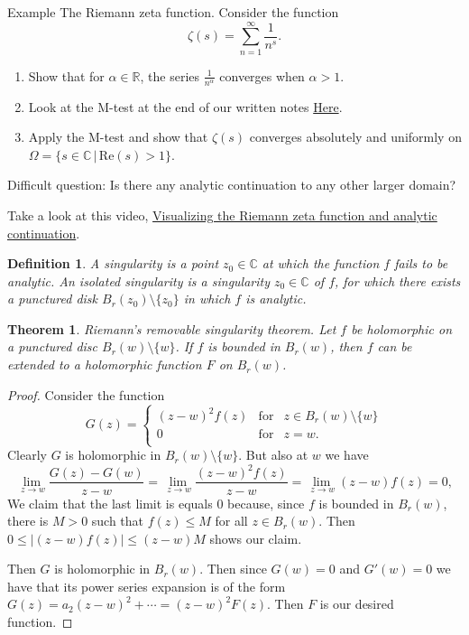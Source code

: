 \documentclass{amsart}
\newtheorem{thm}{Theorem}
\newtheorem{mydef}{Definition}
\begin{document}
\alert{Example} The Riemann zeta function. Consider the function 
\[ \zeta(s) = \sum_{n=1}^{\infty} \frac{1}{n^s} .\]
\begin{enumerate}
\item Show that for \(\alpha \in \mathbb{R}\), the series \(\frac{1}{n^{\alpha}}\) converges when \(\alpha >1\).
\item Look at the M-test at the end of our written notes \alert{\href{https://platforma2.polsl.pl/rms/pluginfile.php/180132/mod\_resource/content/1/Lecture\_power\_series.pdf}{Here}}.
\item Apply the M-test and show that \(\zeta(s)\) converges absolutely and uniformly on \(\Omega = \{ s\in \mathbb{C}\,|\, \mbox{Re}(s) >1 \}\).
\end{enumerate}

Difficult question: Is there any analytic continuation to any other larger domain?

Take a look at this video, \alert{\href{https://youtu.be/sD0NjbwqlYw}{Visualizing the Riemann zeta function and analytic continuation}}.


\begin{mydef}
A \alert{singularity}  is a point \(z_0\in \mathbb{C}\) at which the function \(f\) fails to be analytic.
An \alert{isolated singularity} is a singularity \(z_0\in \mathbb{C}\) of \(f\), for which there exists a punctured disk \(B_r(z_0)\setminus\{z_0\}\) in which \(f\) is analytic.
\end{mydef}


\begin{thm}
\alert{Riemann's removable singularity theorem}. Let \(f\) be holomorphic on a punctured disc \(B_r(w) \setminus \{w\}\). If \(f\) is bounded in \(B_r(w)\), then \(f\) can be extended to a holomorphic function \(F\) on \(B_r(w)\).
\end{thm}
\begin{proof}
Consider the function
\[ G(z) = \left\{ \begin{array}{ccc}
(z-w)^2 f(z) & \mbox{for} & z \in B_r(w)\setminus\{w\} \\
0 & \mbox{for} & z = w. \\
\end{array} \right. \]
Clearly \(G\) is holomorphic in \(B_r(w)\setminus\{w\}\). But also at \(w\) we have
\[ \lim_{\ z \to w} \frac{ G(z) - G(w)}{z-w} = \lim_{\ z \to w} \frac{(z-w)^2 f(z)}{z-w} = \lim_{\ z \to w} (z-w)f(z) = 0, \]
We claim that the last limit is equals \(0\) because, since \(f\) is bounded in \(B_r(w)\), there is \(M>0\) such that \(f(z) \leq M\) for all \(z\in B_r(w)\). 
Then \(0 \leq |(z-w)f(z)| \leq (z-w)M\) shows our claim.

Then \(G\) is holomorphic in \(B_r(w)\). Then since \(G(w) = 0\) and \(G'(w) = 0\) we have that its power series expansion is of the form \(G(z) = a_2 (z-w)^2 + \cdots = (z-w)^2 F(z)\).
Then \(F\) is our desired function.
\end{proof}
\end{document}

